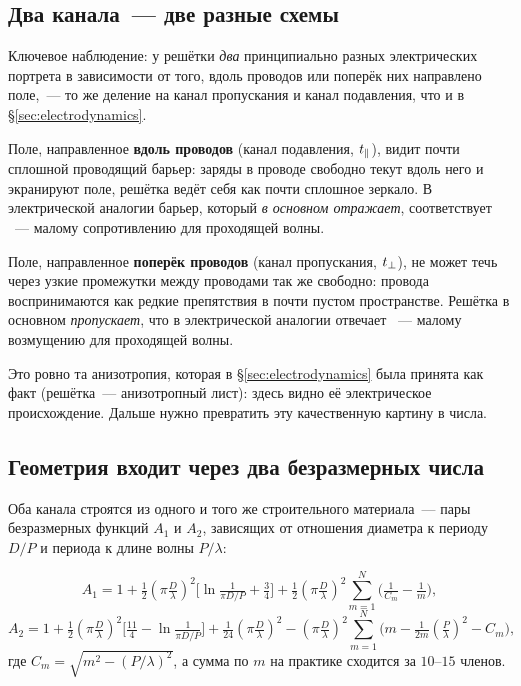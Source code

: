 \subsection{Два канала~--- две разные схемы}
\label{subsec:two-circuits}

Ключевое наблюдение: у решётки \emph{два} принципиально разных электрических портрета в
зависимости от того, вдоль проводов или поперёк них направлено поле,~--- то же деление на канал
пропускания и канал подавления, что и в §\ref{sec:electrodynamics}.

\begin{intuition}
Поле, направленное \textbf{вдоль проводов} (канал подавления, $t_{\parallel}$), видит почти сплошной
проводящий барьер: заряды в проводе свободно текут вдоль него и экранируют поле, решётка ведёт
себя как почти сплошное зеркало. В электрической аналогии барьер, который \emph{в основном
отражает}, соответствует ~--- малому сопротивлению для проходящей волны.

Поле, направленное \textbf{поперёк проводов} (канал пропускания, $t_{\perp}$), не может течь через
узкие промежутки между проводами так же свободно: провода воспринимаются как редкие препятствия в
почти пустом пространстве. Решётка в основном \emph{пропускает}, что в электрической аналогии
отвечает ~--- малому возмущению для проходящей волны.
\end{intuition}

Это ровно та анизотропия, которая в §\ref{sec:electrodynamics} была принята как факт (решётка~---
анизотропный лист): здесь видно её электрическое происхождение. Дальше нужно превратить эту
качественную картину в числа.

\subsection{Геометрия входит через два безразмерных числа}
\label{subsec:A1A2}

Оба канала строятся из одного и того же строительного материала~--- пары безразмерных функций
$A_1$ и $A_2$, зависящих от отношения диаметра к периоду $D/P$ и периода к длине волны
$P/\lambda$:

\begin{equation}
  A_1=1+\tfrac12(\pi\tfrac{D}{\lambda})^2\Big[\ln\tfrac{1}{\pi D/P}+\tfrac34\Big]
        +\tfrac12(\pi\tfrac{D}{\lambda})^2\sum_{m=1}^{N}\Big(\tfrac1{C_m}-\tfrac1m\Big),
  \label{eq:A1}
\end{equation}
\begin{equation}
  A_2=1+\tfrac12(\pi\tfrac{D}{\lambda})^2\Big[\tfrac{11}{4}-\ln\tfrac{1}{\pi D/P}\Big]
        +\tfrac1{24}(\pi\tfrac{D}{\lambda})^2
        -(\pi\tfrac{D}{\lambda})^2\sum_{m=1}^{N}\Big(m-\tfrac1{2m}(\tfrac{P}{\lambda})^2-C_m\Big),
  \label{eq:A2}
\end{equation}
где $C_m=\sqrt{m^2-(P/\lambda)^2}$, а сумма по $m$ на практике сходится за $10$--$15$ членов.


